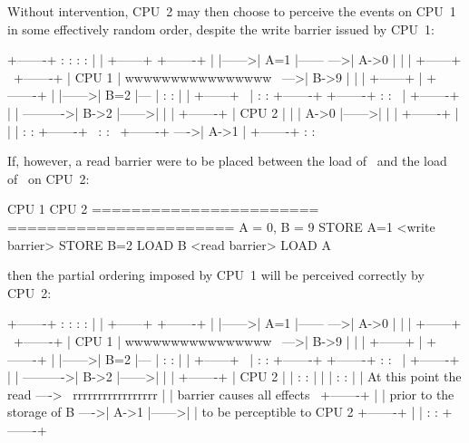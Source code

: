 Without intervention, CPU~2 may then choose to perceive the events on CPU~1 in
some effectively random order, despite the write barrier issued by CPU~1:

  \begin{VerbatimU}
	+-------+       :      :                :       :
	|       |       +------+                +-------+
	|       |------>| A=1  |------      --->| A->0  |
	|       |       +------+      \         +-------+
	| CPU 1 |   wwwwwwwwwwwwwwww   \    --->| B->9  |
	|       |       +------+        |       +-------+
	|       |------>| B=2  |---     |       :       :
	|       |       +------+   \    |       :       :       +-------+
	+-------+       :      :    \   |       +-------+       |       |
	                             ---------->| B->2  |------>|       |
	                                |       +-------+       | CPU 2 |
	                                |       | A->0  |------>|       |
	                                |       +-------+       |       |
	                                |       :       :       +-------+
	                                 \      :       :
	                                  \     +-------+
	                                   ---->| A->1  |
	                                        +-------+
	                                        :       :
\end{VerbatimU}

If, however, a read barrier were to be placed between the load of~ and the
load of~ on CPU~2:

\begin{VerbatimU}
	CPU 1                   CPU 2
	=======================	=======================
		{ A = 0, B = 9 }
	STORE A=1
	<write barrier>
	STORE B=2
	                        LOAD B
	                        <read barrier>
	                        LOAD A
\end{VerbatimU}

\noindent%
then the partial ordering imposed by CPU~1 will be perceived correctly by
CPU~2:

\begin{VerbatimU}
	+-------+       :      :                :       :
	|       |       +------+                +-------+
	|       |------>| A=1  |------      --->| A->0  |
	|       |       +------+      \         +-------+
	| CPU 1 |   wwwwwwwwwwwwwwww   \    --->| B->9  |
	|       |       +------+        |       +-------+
	|       |------>| B=2  |---     |       :       :
	|       |       +------+   \    |       :       :       +-------+
	+-------+       :      :    \   |       +-------+       |       |
	                             ---------->| B->2  |------>|       |
	                                |       +-------+       | CPU 2 |
	                                |       :       :       |       |
	                                |       :       :       |       |
	  At this point the read ---->   \  rrrrrrrrrrrrrrrrr   |       |
	  barrier causes all effects      \     +-------+       |       |
	  prior to the storage of B        ---->| A->1  |------>|       |
	  to be perceptible to CPU 2            +-------+       |       |
	                                        :       :       +-------+
\end{VerbatimU}

